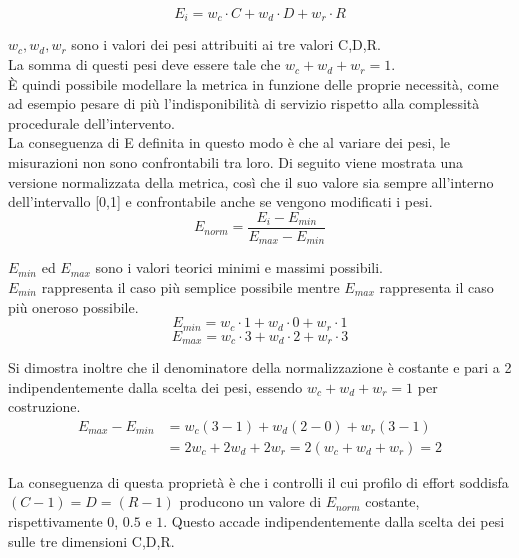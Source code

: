 \documentclass[a4paper,11pt]{report}
\begin{document}
\begin{equation}
E_i = w_c \cdot C + w_d \cdot D + w_r \cdot R
\end{equation}


$w_c, w_d, w_r$ sono i valori dei pesi attribuiti ai tre valori C,D,R.\\
La somma di questi pesi deve essere tale che $w_c + w_d + w_r = 1$. \\

È quindi possibile modellare la metrica in funzione delle proprie necessità, come ad esempio pesare di più l'indisponibilità di servizio rispetto alla complessità procedurale dell'intervento. \\

La conseguenza di E definita in questo modo è che al variare dei pesi, le misurazioni non sono confrontabili tra loro. Di seguito viene mostrata una versione normalizzata della metrica, così che il suo valore sia sempre all'interno dell'intervallo [0,1] e confrontabile anche se vengono modificati i pesi. \\

\begin{equation}
E_{norm} = \frac{E_i - E_{min}}{E_{max} - E_{min}}
\end{equation}

$E_{min}$ ed $E_{max}$ sono i valori teorici minimi e massimi possibili.\\
$E_{min}$ rappresenta il caso più semplice possibile mentre $E_{max}$ rappresenta il caso più oneroso possibile. \\

\begin{equation}
E_{min} = w_c \cdot 1 + w_d \cdot 0 + w_r \cdot 1 
\end{equation}
\begin{equation}
E_{max} = w_c \cdot 3 + w_d \cdot 2 + w_r \cdot 3
\end{equation}


Si dimostra inoltre che il denominatore della normalizzazione è costante e pari a 2 indipendentemente dalla scelta dei pesi, essendo $w_c+w_d+w_r=1$ per costruzione.\\
\begin{align}
E_{max} - E_{min} &= w_c(3-1) + w_d(2-0) + w_r(3-1) \\
&= 2w_c + 2w_d + 2w_r = 2(w_c+w_d+w_r) = 2
\end{align}

La conseguenza di questa proprietà è che i controlli il cui profilo di effort soddisfa $(C-1)=D=(R-1)$ producono un valore di $E_{norm}$ costante, rispettivamente $0$, $0.5$ e $1$. Questo accade indipendentemente dalla scelta dei pesi sulle tre dimensioni C,D,R.\\
\end{document}
